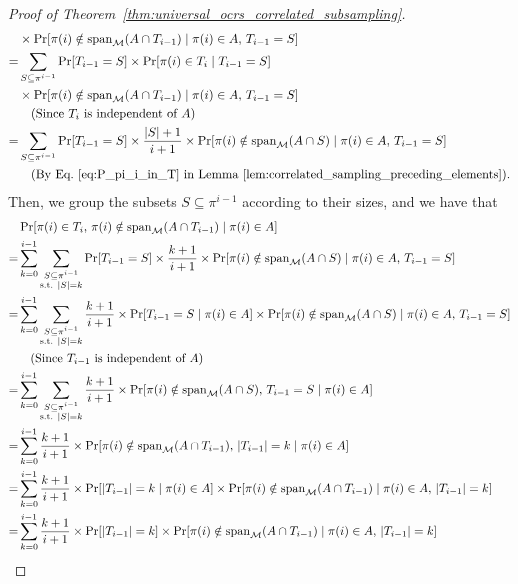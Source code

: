 \documentclass[11pt]{article}
\newcommand{\M}{{\mathcal M}}
\newcommand{\spa}{\textnormal{span}}
\begin{document}
\begin{proof}[Proof of Theorem~\ref{thm:universal_ocrs_correlated_subsampling}]
\begin{align*}
    &\times\Pr[\pi(i)\notin\spa_{\M}(A\cap T_{i-1})\mid \pi(i)\in A,\,T_{i-1}=S]\nonumber\\
    =&\sum_{S\subseteq\pi^{i-1}} \Pr[T_{i-1}=S]\times\Pr[\pi(i)\in T_i\mid T_{i-1}=S]\nonumber\\
    &\times\Pr[\pi(i)\notin\spa_{\M}(A\cap T_{i-1})\mid \pi(i)\in A,\,T_{i-1}=S]\nonumber\\
    &\quad\text{(Since $T_i$ is independent of $A$)}\nonumber\\
    =&\sum_{S\subseteq\pi^{i-1}} \Pr[T_{i-1}=S]\times\frac{|S|+1}{i+1}\times\Pr[\pi(i)\notin\spa_{\M}(A\cap S)\mid \pi(i)\in A,\,T_{i-1}=S]\nonumber\\
    &\quad\text{(By Eq.~\eqref{eq:P_pi_i_in_T} in Lemma~\ref{lem:correlated_sampling_preceding_elements})}.
\end{align*}
Then, we group the subsets $S\subseteq\pi^{i-1}$ according to their sizes, and we have that
\begin{align}\label{eq:decomposed_probability_of_being_selected}
    &\Pr[\pi(i)\in T_i,\,\pi(i)\notin\spa_{\M}(A\cap T_{i-1})\mid \pi(i)\in A]\nonumber\\
    =&\sum_{k=0}^{i-1}\sum_{\substack{S\subseteq\pi^{i-1}\\\textrm{s.t. }|S|=k}} \Pr[T_{i-1}=S]\times\frac{k+1}{i+1}\times\Pr[\pi(i)\notin\spa_{\M}(A\cap S)\mid \pi(i)\in A,\,T_{i-1}=S]\nonumber\\
    =&\sum_{k=0}^{i-1}\sum_{\substack{S\subseteq\pi^{i-1}\\\textrm{s.t. }|S|=k}}\frac{k+1}{i+1}\times\Pr[T_{i-1}=S\mid \pi(i)\in A]\times\Pr[\pi(i)\notin\spa_{\M}(A\cap S)\mid \pi(i)\in A,\,T_{i-1}=S]\nonumber\\
    &\quad\text{(Since $T_{i-1}$ is independent of $A$)}\nonumber\\
    =&\sum_{k=0}^{i-1}\sum_{\substack{S\subseteq\pi^{i-1}\\\textrm{s.t. }|S|=k}}\frac{k+1}{i+1}\times\Pr[\pi(i)\notin\spa_{\M}(A\cap S),\,T_{i-1}=S\mid \pi(i)\in A]\nonumber\\
    =&\sum_{k=0}^{i-1}\frac{k+1}{i+1}\times\Pr[\pi(i)\notin\spa_{\M}(A\cap T_{i-1}),\,|T_{i-1}|=k\mid \pi(i)\in A]\nonumber\\
    =&\sum_{k=0}^{i-1} \frac{k+1}{i+1}\times\Pr[|T_{i-1}|=k\mid\pi(i)\in A]\times\Pr[\pi(i)\notin\spa_{\M}(A\cap T_{i-1})\mid \pi(i)\in A,\,|T_{i-1}|=k]\nonumber\\
    =&\sum_{k=0}^{i-1} \frac{k+1}{i+1}\times\Pr[|T_{i-1}|=k]\times\Pr[\pi(i)\notin\spa_{\M}(A\cap T_{i-1})\mid \pi(i)\in A,\,|T_{i-1}|=k]\nonumber\\

\end{align}
\end{proof}
\end{document}

